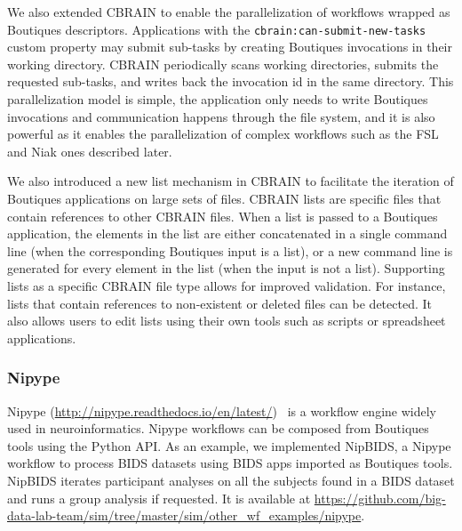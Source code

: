 \documentclass[a4paper,num-refs]{oup-contemporary}
\newcommand{\boutiques}{Boutiques\xspace}
\begin{document}
We also extended CBRAIN to enable the parallelization of workflows
wrapped as \boutiques descriptors. Applications with the
\texttt{cbrain:can-submit-new-tasks} custom property may submit sub-tasks by
creating \boutiques invocations in their working directory. CBRAIN
periodically scans working directories, submits the requested
sub-tasks, and writes back the invocation id in the same
directory. This parallelization model is simple, the application only
needs to write \boutiques invocations and communication happens
through the file system, and it is also powerful as it enables the
parallelization of complex workflows such as the FSL and Niak ones
described later. 

We also introduced a new list mechanism in CBRAIN to facilitate the
iteration of \boutiques applications on large sets of files. CBRAIN
lists are specific files that contain references to other CBRAIN
files. When a list is passed to a \boutiques application, the elements
in the list are either concatenated in a single command line (when the
corresponding \boutiques input is a list), or a new command line is
generated for every element in the list (when the input is not a
list). Supporting lists as a specific CBRAIN file type allows for
improved validation. For instance, lists that contain references to
non-existent or deleted files can be detected. It also allows users to
edit lists using their own tools such as scripts or spreadsheet
applications.

\subsubsection{Nipype}
Nipype
(\url{http://nipype.readthedocs.io/en/latest/})~\cite{gorgolewski2011nipype}
is a workflow engine widely used in neuroinformatics. Nipype workflows
can be composed from \boutiques tools using the Python API. As an
example, we implemented NipBIDS, a Nipype workflow to process BIDS
datasets using BIDS apps imported as \boutiques tools. NipBIDS iterates
participant analyses on all the subjects found in a BIDS dataset and
runs a group analysis if requested. It is available at
\url{https://github.com/big-data-lab-team/sim/tree/master/sim/other_wf_examples/nipype}.
\end{document}
